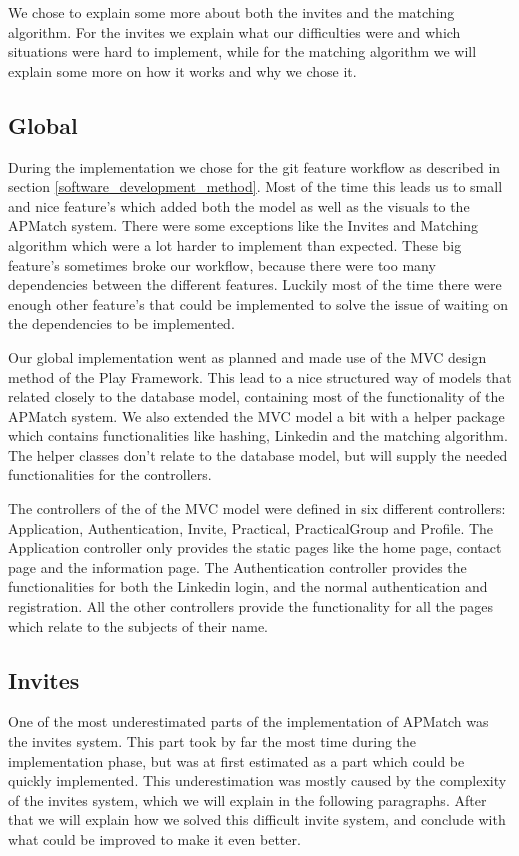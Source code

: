 We chose to explain some more about both the invites and the matching algorithm.
For the invites we explain what our difficulties were and which situations were hard to implement, while for the matching algorithm we will explain some more on how it works and why we chose it.

\subsection{Global}
During the implementation we chose for the git feature workflow as described in section \ref{software_development_method}.
Most of the time this leads us to small and nice feature's which added both the model as well as the visuals to the APMatch system.
There were some exceptions like the Invites and Matching algorithm which were a lot harder to implement than expected.
These big feature's sometimes broke our workflow, because there were too many dependencies between the different features.
Luckily most of the time there were enough other feature's that could be implemented to solve the issue of waiting on the dependencies to be implemented.

Our global implementation went as planned and made use of the MVC design method of the Play Framework.
This lead to a nice structured way of models that related closely to the database model, containing most of the functionality of the APMatch system.
We also extended the MVC model a bit with a helper package which contains functionalities like hashing, Linkedin and the matching algorithm.
The helper classes don't relate to the database model, but will supply the needed functionalities for the controllers.

The controllers of the of the MVC model were defined in six different controllers: Application, Authentication, Invite, Practical, PracticalGroup and Profile.
The Application controller only provides the static pages like the home page, contact page and the information page.
The Authentication controller provides the functionalities for both the Linkedin login, and the normal authentication and registration.
All the other controllers provide the functionality for all the pages which relate to the subjects of their name.

\subsection{Invites}
One of the most underestimated parts of the implementation of APMatch was the invites system.
This part took by far the most time during the implementation phase, but was at first estimated as a part which could be quickly implemented.
This underestimation was mostly caused by the complexity of the invites system, which we will explain in the following paragraphs.
After that we will explain how we solved this difficult invite system, and conclude with what could be improved to make it even better.

